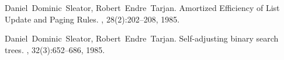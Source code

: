 \documentclass[11pt]{article}
\begin{document}


\begin{thebibliography}{42}

Daniel~Dominic~Sleator, Robert~Endre~Tarjan.
\newblock Amortized Efficiency of List Update and Paging Rules.
, 28(2):202--208, 1985.

Daniel~Dominic~Sleator, Robert~Endre~Tarjan.
\newblock Self-adjusting binary search trees. 
,
32(3):652–686, 1985.

\end{thebibliography}
\end{document}
